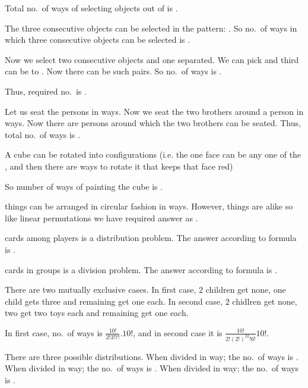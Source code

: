   Total no.\ of ways of selecting  objects out of  is .

  The three consecutive objects can be selected in the pattern: . So no.\ of ways in which three consecutive objects can be selected is .

  Now we select two consecutive objects and one separated. We can pick  and third can be 
  to . Now there can be  such pairs. So no.\ of ways is .

  Thus, required no.\ is .
\item Let us seat the  persons in  ways. Now we seat the two brothers around a person in 
  ways. Now there are  persons around which the two brothers can be seated. Thus, total no.\ of ways
  is .
\item A cube can be rotated into  configurations (i.e. the one face can be any one of the
  , and then there are  ways to rotate it that keeps that face red)

  So number of ways of painting the cube is .
\item {} things can be arranged in circular fashion in  ways. However,  things are alike
  so like linear permutations we have required answer as .
\item {} cards among  players is a distribution problem. The answer according to formula is
  .

   cards in  groups is a division problem. The answer according to formula is
  .
\item There are two mutually exclusive cases. In first case, $2$ children get none, one child gets three and
  remaining get one each. In second case, $2$ chidlren get none, two get two toys each and remaining get one
  each.

  In first case, no.\ of ways is $\frac{10!}{2!3!7!}.10!$, and in second case it is
  $\frac{10!}{2!(2!)^22!6!}10!$.
\item There are three possible distributions. When divided in  way; the no.\ of ways is
  . When divided in  way; the no.\ of ways is
  . When divided in  way; the no.\ of ways is
  .

